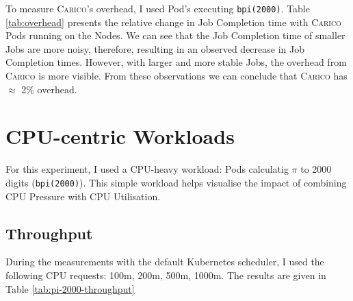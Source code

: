 To measure \textsc{Carico}'s overhead, I used Pod's executing \texttt{bpi(2000)}. Table
\ref{tab:overhead} presents the relative change in Job Completion time with
\textsc{Carico} Pods running on the Nodes. We can see that the Job Completion time of
smaller Jobs are more noisy, therefore, resulting in an observed decrease in Job
Completion times. However, with larger and more stable Jobs, the overhead from
\textsc{Carico} is more visible. From these observations we can conclude that \textsc{Carico} has
$\approx$ 2\% overhead.
%
\section{CPU-centric Workloads}
\label{sec:eval-cpu-centric}
For this experiment, I used a CPU-heavy workload: Pods calculatig $\pi$ to 2000
digits (\texttt{bpi(2000)}). This simple workload helps visualise the impact of
combining CPU Pressure with CPU Utilisation.

\subsection{Throughput}
During the measurements with the default Kubernetes scheduler, I used the
following CPU requests: 100m, 200m, 500m, 1000m. The results are given in Table
\ref{tab:pi-2000-throughput}

%

